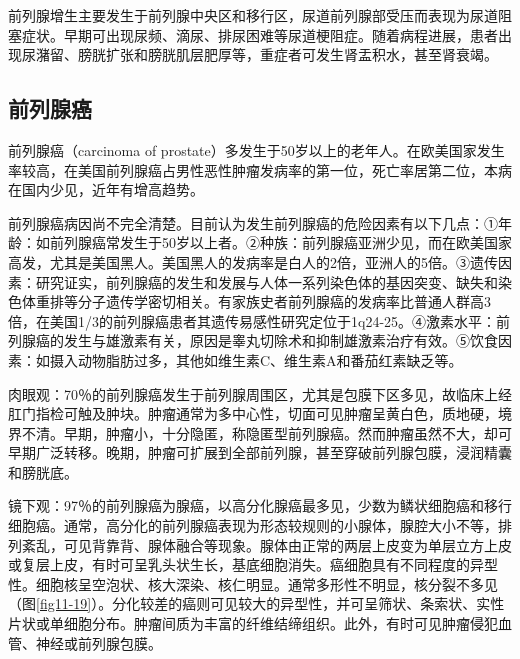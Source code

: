 前列腺增生主要发生于前列腺中央区和移行区，尿道前列腺部受压而表现为尿道阻塞症状。早期可出现尿频、滴尿、排尿困难等尿道梗阻症。随着病程进展，患者出现尿潴留、膀胱扩张和膀胱肌层肥厚等，重症者可发生肾盂积水，甚至肾衰竭。

\subsection{前列腺癌}

前列腺癌（carcinoma of
prostate）多发生于50岁以上的老年人。在欧美国家发生率较高，在美国前列腺癌占男性恶性肿瘤发病率的第一位，死亡率居第二位，本病在国内少见，近年有增高趋势。

前列腺癌病因尚不完全清楚。目前认为发生前列腺癌的危险因素有以下几点：①年龄：如前列腺癌常发生于50岁以上者。②种族：前列腺癌亚洲少见，而在欧美国家高发，尤其是美国黑人。美国黑人的发病率是白人的2倍，亚洲人的5倍。③遗传因素：研究证实，前列腺癌的发生和发展与人体一系列染色体的基因突变、缺失和染色体重排等分子遗传学密切相关。有家族史者前列腺癌的发病率比普通人群高3倍，在美国1/3的前列腺癌患者其遗传易感性研究定位于1q24-25。④激素水平：前列腺癌的发生与雄激素有关，原因是睾丸切除术和抑制雄激素治疗有效。⑤饮食因素：如摄入动物脂肪过多，其他如维生素C、维生素A和番茄红素缺乏等。

肉眼观：70％的前列腺癌发生于前列腺周围区，尤其是包膜下区多见，故临床上经肛门指检可触及肿块。肿瘤通常为多中心性，切面可见肿瘤呈黄白色，质地硬，境界不清。早期，肿瘤小，十分隐匿，称隐匿型前列腺癌。然而肿瘤虽然不大，却可早期广泛转移。晚期，肿瘤可扩展到全部前列腺，甚至穿破前列腺包膜，浸润精囊和膀胱底。

镜下观：97％的前列腺癌为腺癌，以高分化腺癌最多见，少数为鳞状细胞癌和移行细胞癌。通常，高分化的前列腺癌表现为形态较规则的小腺体，腺腔大小不等，排列紊乱，可见背靠背、腺体融合等现象。腺体由正常的两层上皮变为单层立方上皮或复层上皮，有时可呈乳头状生长，基底细胞消失。癌细胞具有不同程度的异型性。细胞核呈空泡状、核大深染、核仁明显。通常多形性不明显，核分裂不多见（图\ref{fig11-19}）。分化较差的癌则可见较大的异型性，并可呈筛状、条索状、实性片状或单细胞分布。肿瘤间质为丰富的纤维结缔组织。此外，有时可见肿瘤侵犯血管、神经或前列腺包膜。

